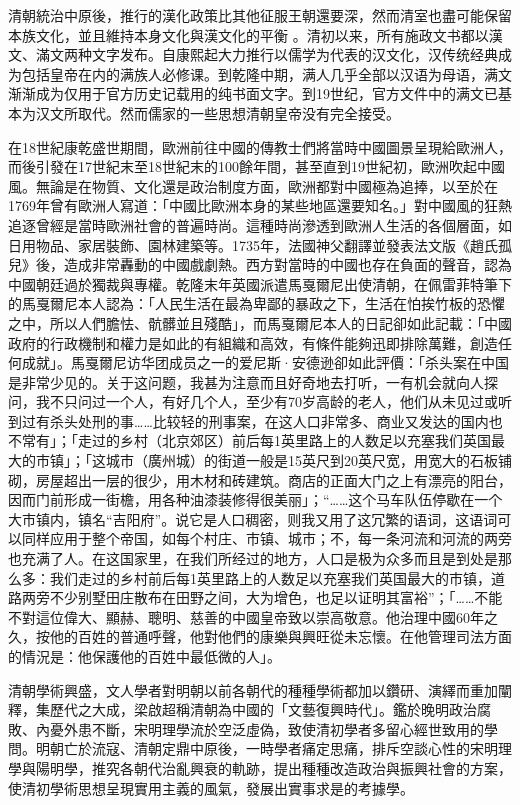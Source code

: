 清朝統治中原後，推行的漢化政策比其他征服王朝還要深，然而清室也盡可能保留本族文化，並且維持本身文化與漢文化的平衡 。清初以来，所有施政文书都以漢文、滿文两种文字发布。自康熙起大力推行以儒学为代表的汉文化，汉传统经典成为包括皇帝在内的满族人必修课。到乾隆中期，满人几乎全部以汉语为母语，满文渐渐成为仅用于官方历史记载用的纯书面文字。到19世纪，官方文件中的满文已基本为汉文所取代。然而儒家的一些思想清朝皇帝没有完全接受。

在18世紀康乾盛世期間，歐洲前往中國的傳教士們將當時中國圖景呈現給歐洲人，而後引發在17世紀末至18世紀末的100餘年間，甚至直到19世紀初，歐洲吹起中國風。無論是在物質、文化還是政治制度方面，歐洲都對中國極為追捧，以至於在1769年曾有歐洲人寫道：「中國比歐洲本身的某些地區還要知名。」對中國風的狂熱追逐曾經是當時歐洲社會的普遍時尚。這種時尚滲透到歐洲人生活的各個層面，如日用物品、家居裝飾、園林建築等。1735年，法國神父翻譯並發表法文版《趙氏孤兒》後，造成非常轟動的中國戲劇熱。西方對當時的中國也存在負面的聲音，認為中國朝廷過於獨裁與專權。乾隆末年英國派遣馬戛爾尼出使清朝，在佩雷菲特筆下的馬戛爾尼本人認為：「人民生活在最為卑鄙的暴政之下，生活在怕挨竹板的恐懼之中，所以人們膽怯、骯髒並且殘酷」，而馬戛爾尼本人的日記卻如此記載：「中國政府的行政機制和權力是如此的有組織和高效，有條件能夠迅即排除萬難，創造任何成就」。馬戛爾尼访华团成员之一的爱尼斯·安德逊卻如此評價：「杀头案在中国是非常少见的。关于这问题，我甚为注意而且好奇地去打听，一有机会就向人探问，我不只问过一个人，有好几个人，至少有70岁高龄的老人，他们从未见过或听到过有杀头处刑的事……比较轻的刑事案，在这人口非常多、商业又发达的国内也不常有」；「走过的乡村（北京郊区）前后每1英里路上的人数足以充塞我们英国最大的市镇」；「这城市（廣州城）的街道一般是15英尺到20英尺宽，用宽大的石板铺砌，房屋超出一层的很少，用木材和砖建筑。商店的正面大门之上有漂亮的阳台，因而门前形成一街檐，用各种油漆装修得很美丽」；“……这个马车队伍停歇在一个大市镇内，镇名“吉阳府”。说它是人口稠密，则我又用了这冗繁的语词，这语词可以同样应用于整个帝国，如每个村庄、市镇、城市；不，每一条河流和河流的两旁也充满了人。在这国家里，在我们所经过的地方，人口是极为众多而且是到处是那么多：我们走过的乡村前后每1英里路上的人数足以充塞我们英国最大的市镇，道路两旁不少别墅田庄散布在田野之间，大为增色，也足以证明其富裕”；「……不能不對這位偉大、顯赫、聰明、慈善的中國皇帝致以崇高敬意。他治理中國60年之久，按他的百姓的普通呼聲，他對他們的康樂與興旺從未忘懷。在他管理司法方面的情況是：他保護他的百姓中最低微的人」。

清朝學術興盛，文人學者對明朝以前各朝代的種種學術都加以鑽研、演繹而重加闡釋，集歷代之大成，梁啟超稱清朝為中國的「文藝復興時代」。鑑於晚明政治腐敗、內憂外患不斷，宋明理學流於空泛虛偽，致使清初學者多留心經世致用的學問。明朝亡於流寇、清朝定鼎中原後，一時學者痛定思痛，排斥空談心性的宋明理學與陽明學，推究各朝代治亂興衰的軌跡，提出種種改造政治與振興社會的方案，使清初學術思想呈現實用主義的風氣，發展出實事求是的考據學。

